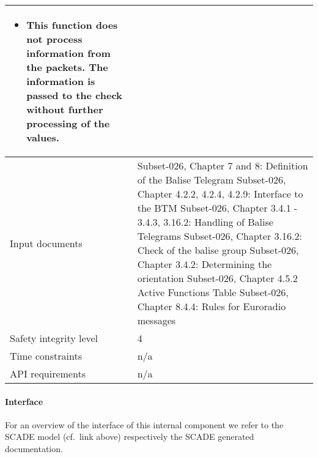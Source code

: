 \begin{longtable}{p{}p{}}
\begin{itemize}
\item This function does not process information from the packets. The information is passed to the check without further processing of the values. 
\end{itemize} \\
\midrule
Input documents	&
  Subset-026, Chapter 7 and 8: Definition of the Balise Telegram\newline
  Subset-026, Chapter 4.2.2, 4.2.4, 4.2.9: Interface to the BTM\newline
  Subset-026, Chapter 3.4.1 - 3.4.3, 3.16.2: Handling of Balise Telegrams\newline
  Subset-026, Chapter 3.16.2: Check of the balise group\newline
  Subset-026, Chapter 3.4.2: Determining the orientation\newline
  Subset-026, Chapter 4.5.2 Active Functions Table\newline
  Subset-026, Chapter 8.4.4: Rules for Euroradio messages \\
\midrule
Safety integrity level		& 4 \\
\midrule
Time constraints		& n/a \\
\midrule
API requirements 		& n/a \\
\bottomrule
\end{longtable}


\paragraph{Interface}

For an overview of the interface of this internal component we refer to the SCADE model (cf.~link above) respectively the SCADE generated documentation.